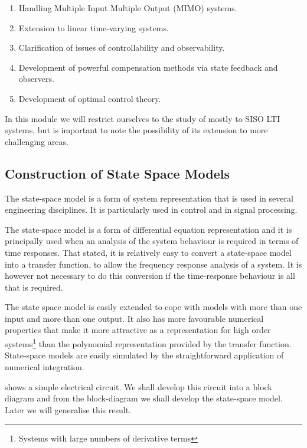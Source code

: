 \begin{slide}\label{slides:l13s2}
\begin{enumerate}
\item Handling Multiple Input Multiple Output (MIMO) systems.
\item Extension to linear time-varying systems.
\item Clarification of issues of controllability and observability.
\item Development of powerful compensation methods via state feedback and observers.
\item Development of optimal control theory.
\end{enumerate}
\end{slide}
In this module we will restrict ourselves to the study of mostly to SISO LTI systems, but is important to note the possibility of its extension to more challenging areas.


\subsection*{Construction of State Space Models}

The state-space model is a form of system representation that is used
in several engineering disciplines. It is particularly used in control
and in signal processing.

The state-space model is a form of differential equation
representation and it is principally used when an analysis of the
system behaviour is required in terms of time responses. That
stated, it is relatively easy to convert a state-space model into
a transfer function, to allow the frequency response analysis of a
system. It is however not necessary to do this conversion if the
time-response behaviour is all that is required.

The state space model is easily extended to cope with models with more
than one input and more than one output. It also has more favourable
numerical properties that make it more attractive as a representation
for high order systems\footnote{Systems with large numbers of
  derivative terms} than the polynomial representation provided by the
transfer function. State-space models are easily simulated by the
straightforward application of numerical integration.

 shows a simple electrical circuit. We shall develop
this circuit into a block diagram and from the block-diagram we shall
develop the state-space model. Later we will generalise this result.

